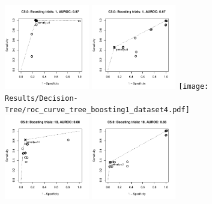 \documentclass{article}
\begin{document}
\begin{figure}
  \includegraphics[width=0.33\textwidth]{Results/Decision-Tree/roc_curve_tree_boosting1_dataset1.pdf}\hspace{-0.3cm}
  \includegraphics[width=0.33\textwidth]{Results/Decision-Tree/roc_curve_tree_boosting1_dataset2.pdf}\hspace{-0.3cm}
  \texttt{[image: Results/Decision-Tree/roc\_curve\_tree\_boosting1\_dataset4.pdf]} \\
  \includegraphics[width=0.33\textwidth]{Results/Decision-Tree/roc_curve_tree_boosting10_dataset1.pdf}\hspace{-0.3cm}
  \includegraphics[width=0.33\textwidth]{Results/Decision-Tree/roc_curve_tree_boosting10_dataset2.pdf}\hspace{-0.3cm}

\end{figure}
\end{document}
